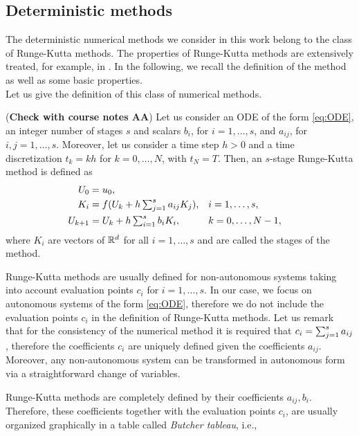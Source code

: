 \subsection{Deterministic methods}

The deterministic numerical methods we consider in this work belong to the class of Runge-Kutta methods. The properties of Runge-Kutta methods are extensively treated, for example, in \cite{HLW02, HaW96}. In the following, we recall the definition of the method as well as some basic properties. \\
Let us give the definition of this class of numerical methods.
\begin{definition}\label{def:RK} (\textbf{Check with course notes AA}) Let us consider an ODE of the form \eqref{eq:ODE}, an integer number of stages $s$ and scalars $b_i$, for $i = 1, \ldots, s$, and $a_{ij}$, for $i, j = 1, \ldots, s$. Moreover, let us consider a time step $h > 0$ and a time discretization $t_k = kh$ for $k = 0, \ldots, N$, with $t_N = T$. Then, an $s$-stage Runge-Kutta method is defined as
\begin{equation}
\begin{aligned}
	U_0 &= u_0, \\
	K_i &= f(U_k + h\textstyle\sum_{j=1}^s a_{ij}K_j), && i = 1, \ldots, s, \\
	U_{k+1} &= U_k + h \textstyle\sum_{i=1}^s b_i K_i, && k = 0, \ldots, N-1,
\end{aligned}
\end{equation}
where $K_i$ are vectors of $\mathbb{R}^d$ for all $i = 1, \ldots, s$ and are called the stages of the method.
\end{definition}
\begin{remark} Runge-Kutta methods are usually defined for non-autonomous systems taking into account evaluation points $c_i$ for $i = 1, \ldots, s$. In our case, we focus on autonomous systems of the form \eqref{eq:ODE}, therefore we do not include the evaluation points $c_i$ in the definition of Runge-Kutta methods. Let us remark that for the consistency of the numerical method it is required that $c_i = \textstyle\sum_{j=1}^s a_{ij}$, therefore the coefficients $c_i$ are uniquely defined given the coefficients $a_{ij}$. Moreover, any non-autonomous system can be transformed in autonomous form via a straightforward change of variables. 
\end{remark}
\noindent Runge-Kutta methods are completely defined by their coefficients $a_{ij}, b_i$. Therefore, these coefficients together with the evaluation points $c_i$, are usually organized graphically in a table called \textit{Butcher tableau}, i.e.,
